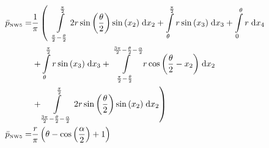 \begin{align}
    \bar{p}_{\text{\tiny{NW5}}} =&\frac{1}{\pi} \left(\;\;\int\limits_{\frac{\pi}{2} - \frac{\theta}{2}}^{\frac{\pi}{2}}2 r \sin{\left (\frac{\theta}{2} \right )} \sin{\left (x_{2} \right )}\;\mathrm{d}x_{2}+\int\limits_{\theta}^{\frac{\pi}{2}}r \sin{\left (x_{3} \right )}\;\mathrm{d}x_{3}+\int\limits_{0}^{\theta}r\;\mathrm{d}x_{4}\right.\notag\\
 &\left.+\int\limits_{\theta}^{\frac{\pi}{2}}r \sin{\left (x_{3} \right )}\;\mathrm{d}x_{3}+\int\limits_{\frac{\pi}{2} - \frac{\theta}{2}}^{\frac{3 \pi}{2} - \frac{\theta}{2} - \frac{\alpha}{2}}r \cos{\left (\frac{\theta}{2} - x_{2} \right )}\;\mathrm{d}x_{2}\right.\notag\\
 &\left.+\int\limits_{\frac{3 \pi}{2} - \frac{\theta}{2} - \frac{\alpha}{2}}^{\frac{\pi}{2}}2 r \sin{\left (\frac{\theta}{2} \right )} \sin{\left (x_{2} \right )}\;\mathrm{d}x_{2}\right)\label{pNW5Def}\\
    \bar{p}_{\text{\tiny{NW5}}}  =& \frac{r}{\pi} \left(\theta - \cos{\left (\frac{\alpha}{2} \right )} + 1\right)\label{pNW5Sln}
\end{align}
